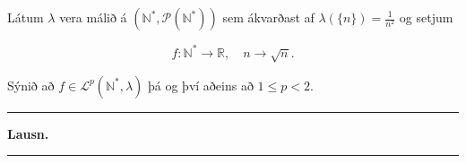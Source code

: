 \documentclass[]{book}
\begin{document}
Látum \(\lambda\) vera málið á \((\mathbb N^*, \mathcal P(\mathbb N^*))\) sem ákvarðast af \(\lambda(\{n\}) = \frac{1}{n^2}\) og setjum

\[
 f:\mathbb N^*\rightarrow\mathbb R, \quad n\rightarrow\sqrt n.
\]

Sýnið að \(f\in\mathcal L^p(\mathbb N^*,\lambda)\) þá og því aðeins að \(1\leq p< 2\).

\begin{center}\rule{0.5\linewidth}{\linethickness}\end{center}

\textbf{Lausn.}

\begin{center}\rule{0.5\linewidth}{\linethickness}\end{center}
\end{document}
